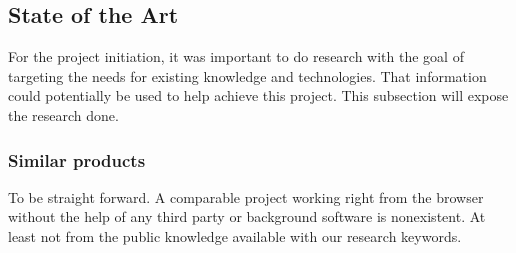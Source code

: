 
\subsection{State of the Art}
For the project initiation, it was important to do research with the goal of targeting the needs for existing knowledge and technologies. That information could potentially be used to help achieve this project. This subsection will expose the research done.

\subsubsection{Similar products}
To be straight forward. A comparable project working right from the browser without the help of any third party or background software is nonexistent. At least not from the public knowledge available with our research keywords.









